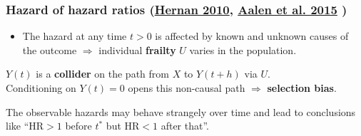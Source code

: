 \documentclass[12pt,dvipsnames,t,aspectratio=169, handout%
]{beamer}
\begin{document}
\begin{frame}
\frametitle{\large Hazard of hazard ratios {\small (\href{https://doi.org/10.1097/EDE.0b013e3181c1ea43}{Hernan 2010}, 
  \href{https://doi.org/10.1007/s10985-015-9335-y}{Aalen et al. 2015} ) } }

\begin{itemize}
\item
The hazard at any time $t > 0$ is affected by known and unknown causes of the outcome
$\Rightarrow$ individual {\bf frailty} $U$ varies in the population.
\end{itemize}
{\small
}
\pause
\bi
\item
$Y(t)$ %
is a {\bf collider} on the path from $X$ to $Y(t+h)$ via $U$. \\ 
Conditioning on $Y(t)=0$ opens this non-causal path $\Rightarrow$ \textbf{selection bias}.
\medskip
\item
The observable hazards may behave strangely over time and lead to
conclusions like ``HR$>1$ before $t^*$ but HR$<1$ after that''.
\ei
\end{frame}
\end{document}
